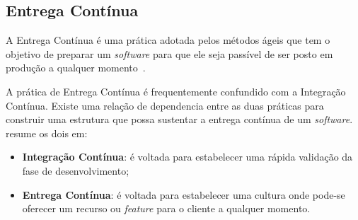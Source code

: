 \subsection{Entrega Contínua}

A Entrega Contínua é uma prática adotada pelos métodos ágeis que tem o objetivo
de preparar um \textit{software} para que ele seja passível de ser posto em produção a
qualquer momento~\cite{olausson:2016}. 

A prática de Entrega Contínua  é frequentemente confundido com a Integração
Contínua. Existe uma relação de dependencia entre as duas práticas para
construir uma estrutura que possa sustentar a entrega contínua de um
\textit{software}.~ resume os dois em:

\begin{itemize}
  \item \textbf{Integração Contínua}: é voltada para estabelecer uma rápida
    validação da fase de desenvolvimento;
  \item \textbf{Entrega Contínua}: é voltada para estabelecer uma cultura onde
    pode-se oferecer um recurso ou \textit{feature} para o cliente a qualquer
    momento.
\end{itemize}


